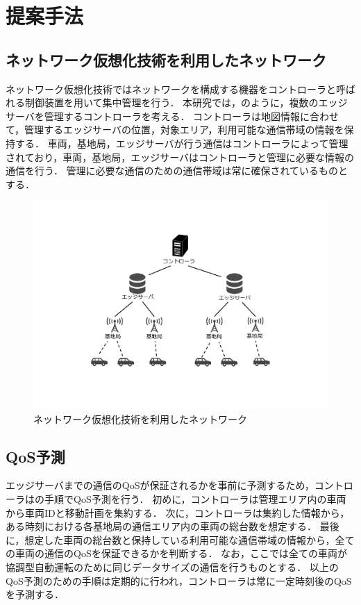 \documentclass[a4paper,10pt,twocolumn,uplatex]{jsarticle}
\begin{document}
\section{提案手法}
\subsection{ネットワーク仮想化技術を利用したネットワーク}
ネットワーク仮想化技術ではネットワークを構成する機器をコントローラと呼ばれる制御装置を用いて集中管理を行う．
本研究では，のように，複数のエッジサーバを管理するコントローラを考える．
コントローラは地図情報に合わせて，管理するエッジサーバの位置，対象エリア，利用可能な通信帯域の情報を保持する．
車両，基地局，エッジサーバが行う通信はコントローラによって管理されており，車両，基地局，エッジサーバはコントローラと管理に必要な情報の通信を行う．
管理に必要な通信のための通信帯域は常に確保されているものとする．

\begin{figure}[t]
	\begin{centering}
    \includegraphics[width=0.90\linewidth]{img/VirtualizationNetwork.pdf}
    \caption{ネットワーク仮想化技術を利用したネットワーク}
    \label{fig:SDNnetwork}
    \end{centering}
\end{figure}

\subsection{QoS予測}
\label{QoSprediction}
エッジサーバまでの通信のQoSが保証されるかを事前に予測するため，コントローラはの手順でQoS予測を行う．
初めに，コントローラは管理エリア内の車両から車両IDと移動計画を集約する．
次に，コントローラは集約した情報から，ある時刻における各基地局の通信エリア内の車両の総台数を想定する．
最後に，想定した車両の総台数と保持している利用可能な通信帯域の情報から，全ての車両の通信のQoSを保証できるかを判断する．
なお，ここでは全ての車両が協調型自動運転のために同じデータサイズの通信を行うものとする．
以上のQoS予測のための手順は定期的に行われ，コントローラは常に一定時刻後のQoSを予測する．
\end{document}
